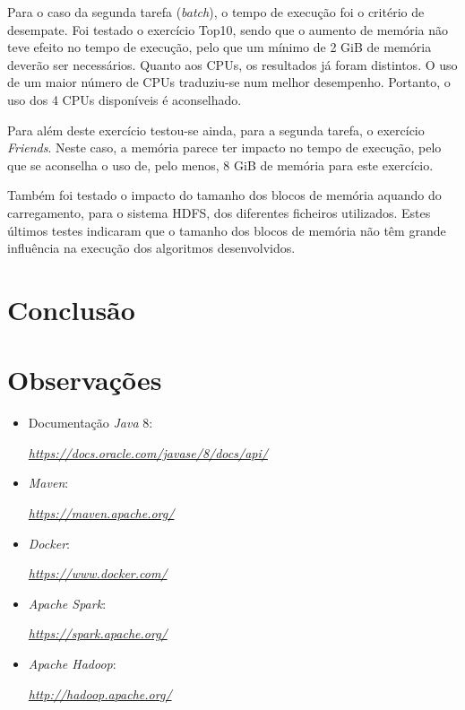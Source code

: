 \documentclass[a4paper]{report}
\begin{document}
    Para o caso da segunda tarefa (\textit{batch}), o tempo de execução foi o critério de desempate.
    Foi testado o exercício Top10, sendo que o aumento de memória não teve efeito no tempo de execução, pelo que um mínimo de 2 GiB de memória deverão ser necessários.
    Quanto aos CPUs, os resultados já foram distintos. O uso de um maior número de CPUs traduziu-se num melhor desempenho. Portanto, o uso dos 4 CPUs disponíveis é aconselhado.
    
    Para além deste exercício testou-se ainda, para a segunda tarefa, o exercício \textit{Friends}. 
    Neste caso, a memória parece ter impacto no tempo de execução, pelo que se aconselha o uso de, pelo menos, 8 GiB de memória para este exercício.

    Também foi testado o impacto do tamanho dos blocos de memória aquando do carregamento, para o sistema HDFS, dos diferentes ficheiros utilizados.
    Estes últimos testes indicaram que o tamanho dos blocos de memória não têm grande influência na execução dos algoritmos desenvolvidos.


\chapter{Conclusão} \label{ch:Conclusion}
\large{
    
}

\appendix
\chapter{Observações} \label{ch:Observations}
\begin{itemize}
    \item Documentação \textit{Java} 8:
    \par \textit{\url{https://docs.oracle.com/javase/8/docs/api/}}
    \item \textit{Maven}:
    \par \textit{\url{https://maven.apache.org/}}
    \item \textit{Docker}:
    \par \textit{\url{https://www.docker.com/}}
    \item \textit{Apache Spark}:
    \par \textit{\url{https://spark.apache.org/}}
    \item \textit{Apache Hadoop}:
    \par \textit{\url{http://hadoop.apache.org/}}
\end{itemize}
\end{document}
